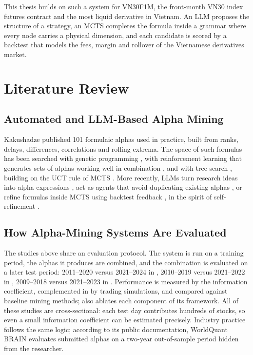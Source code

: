 \documentclass[12pt,a4paper,oneside]{book}
\theoremstyle{definition}
\begin{document}
This thesis builds on such a system for VN30F1M, the front-month VN30 index futures contract and the most liquid derivative in Vietnam. An LLM proposes the structure of a strategy, an MCTS completes the formula inside a grammar where every node carries a physical dimension, and each candidate is scored by a backtest that models the fees, margin and rollover of the Vietnamese derivatives market.

\section{Literature Review}
\label{sec:litreview}

\subsection{Automated and LLM-Based Alpha Mining}

Kakushadze \cite{kakushadze2016} published 101 formulaic alphas used in practice, built from ranks, delays, differences, correlations and rolling extrema. The space of such formulas has been searched with genetic programming \cite{koza1992}, with reinforcement learning that generates sets of alphas working well in combination \cite{yu2023}, and with tree search \cite{xu2024,ren2024}, building on the UCT rule of MCTS \cite{kocsis2006,browne2012}. More recently, LLMs turn research ideas into alpha expressions \cite{wang2023}, act as agents that avoid duplicating existing alphas \cite{tang2025}, or refine formulas inside MCTS using backtest feedback \cite{shi2026}, in the spirit of self-refinement \cite{madaan2023}.

\subsection{How Alpha-Mining Systems Are Evaluated}

The studies above share an evaluation protocol. The system is run on a training period, the alphas it produces are combined, and the combination is evaluated on a later test period: 2011--2020 versus 2021--2024 in \cite{shi2026}, 2010--2019 versus 2021--2022 in \cite{ren2024}, 2009--2018 versus 2021--2023 in \cite{xu2024}. Performance is measured by the information coefficient, complemented in \cite{shi2026,ren2024} by trading simulations, and compared against baseline mining methods; \cite{shi2026} also ablates each component of its framework. All of these studies are cross-sectional: each test day contributes hundreds of stocks, so even a small information coefficient can be estimated precisely. Industry practice follows the same logic; according to its public documentation, WorldQuant BRAIN evaluates submitted alphas on a two-year out-of-sample period hidden from the researcher.
\end{document}
